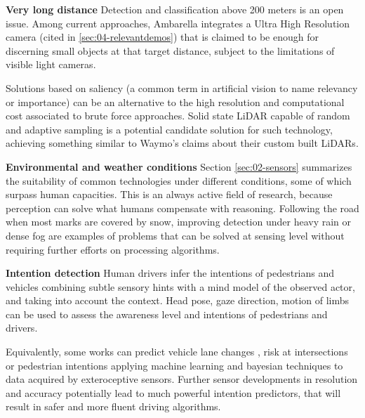 \textbf{Very long distance} 
    Detection and classification above 200 meters is an open issue. 
    Among current approaches, Ambarella integrates a Ultra High Resolution 
    camera (cited in \ref{sec:04-relevantdemos}) that is claimed to be enough
    for discerning small objects at that target distance, subject to the 
    limitations of visible light cameras.
    
    Solutions based on saliency (a common term in artificial vision 
    \cite{Zhang2016a,Palazzi2018,Duthon2016} to name relevancy or importance) 
    can be an alternative to the high resolution and computational cost 
    associated to brute force approaches. Solid state LiDAR capable of
    random and adaptive sampling is a potential candidate solution for such 
    technology, achieving something similar to Waymo's claims about their custom
    built LiDARs.

\textbf{Environmental and weather conditions}    
    Section \ref{sec:02-sensors} summarizes the suitability of common 
    technologies under different conditions, some of which surpass human 
    capacities. 
    This is an always active field of research, because perception 
    can solve what humans compensate with reasoning. Following the road 
    when most marks are covered by snow, improving detection under heavy 
    rain or dense fog are examples of problems that can be solved at sensing
    level without requiring further efforts on processing algorithms.
        
\textbf{Intention detection}        
    Human drivers infer the intentions of pedestrians and vehicles 
    combining subtle sensory hints with a mind model of the observed actor,
    and taking into account the context.
    Head pose, gaze direction, motion of limbs can be used to assess the
    awareness level and intentions of pedestrians and drivers.
                
    Equivalently, some works can predict vehicle lane changes \cite{Kim2017},
    risk at intersections \cite{Lefevre2012} or pedestrian intentions
    \cite{Kohler2015,Fang2017} applying machine learning and bayesian
    techniques to data acquired by exteroceptive sensors. 
    Further sensor developments in resolution and accuracy potentially lead
    to much powerful intention predictors, that will result in safer and more
     fluent driving algorithms.
    
